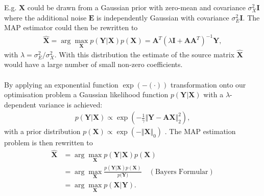 E.g. $\mathbf{X}$ could be drawn from a Gaussian prior with zero-mean and covariance $\sigma_X^2 \mathbf{I}$ where the additional noise $\mathbf{E}$ is independently Gaussian with covariance $\sigma_E^2 \mathbf{I}$. The MAP estimator could then be rewritten to
\begin{align*}
\hat{\mathbf{X}} = \arg \max_{\mathbf{X}} p(\mathbf{Y} \vert \mathbf{X}) p(\mathbf{X}) = \mathbf{A}^T (\lambda \mathbf{I} + \mathbf{AA}^T)^{-1} \mathbf{Y},
\end{align*}
with $\lambda = \sigma_E^2 / \sigma_X^2$. With this distribution the estimate of the source matrix $\hat{\mathbf{X}}$ would have a large number of small non-zero coefficients.
\\ \\
By applying an exponential function $\exp(- (\cdot))$ transformation onto our optimisation problem a Gaussian likelihood function $p(\mathbf{Y} \vert \mathbf{X})$ with a $\lambda$-dependent variance is achieved:
\begin{align*}
p(\mathbf{Y} \vert \mathbf{X}) \propto \exp \left( - \frac{1}{\gamma} \Vert \mathbf{Y} - \mathbf{AX} \Vert_2^2 \right),
\end{align*}
with a prior distribution $p(\mathbf{X}) \propto \exp(- \Vert \mathbf{X} \Vert_0)$ \cite[p. 137]{phd_wipf}. The MAP estimation problem is then rewritten to
\begin{align*}
\hat{\mathbf{X}} &= \arg \max_{\mathbf{X}} p(\mathbf{Y} \vert \mathbf{X}) p(\mathbf{X}) \\
&= \arg \max_{\mathbf{X}} \frac{p(\mathbf{Y} \vert \mathbf{X}) p(\mathbf{X})}{p(\mathbf{Y)}} \quad (\text{Bayers Formular}) \\
&= \arg \max_{\mathbf{X}} p(\mathbf{X} \vert \mathbf{Y}).
\end{align*}

